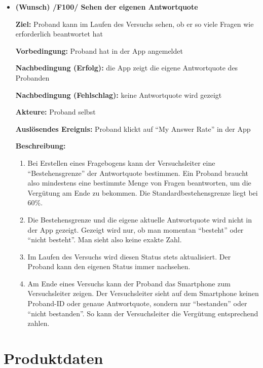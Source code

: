 \documentclass[a4paper]{scrreprt}
\begin{document}
\begin{itemize}
            \item \textbf{(Wunsch) /F100/ Sehen der eigenen \gls{Antwortquote}}

            \par \textbf{Ziel: }\gls{Proband} kann im Laufen des Versuchs sehen, ob er so viele Fragen wie erforderlich beantwortet hat
            \par \textbf{Vorbedingung: }\gls{Proband} hat in der App angemeldet
            \par \textbf{Nachbedingung (Erfolg): }die App zeigt die eigene \gls{Antwortquote} des \gls{Proband}en
            \par \textbf{Nachbedingung (Fehlschlag): }keine \gls{Antwortquote} wird gezeigt
            \par \textbf{Akteure: }\gls{Proband} selbst
            \par \textbf{Auslösendes Ereignis: }\gls{Proband} klickt auf “My Answer Rate” in der App
            \par \textbf{Beschreibung: }
                \begin{enumerate}
                    \item Bei Erstellen eines Fragebogens kann der \gls{Versuchsleiter} eine “Bestehensgrenze” der \gls{Antwortquote} bestimmen. Ein \gls{Proband} braucht also mindestens eine bestimmte Menge von Fragen beantworten, um die Vergütung am Ende zu bekommen. Die Standardbestehensgrenze liegt bei 60\%.
                    \item Die Bestehensgrenze und die eigene aktuelle \gls{Antwortquote} wird nicht in der App gezeigt. Gezeigt wird nur, ob man momentan “besteht” oder “nicht besteht”. Man sieht also keine exakte Zahl.
                    \item Im Laufen des Versuchs wird diesen Status stets aktualisiert. Der \gls{Proband} kann den eigenen Status immer nachsehen.
                    \item Am Ende eines Versuchs kann der \gls{Proband} das Smartphone zum \gls{Versuchsleiter} zeigen. Der \gls{Versuchsleiter} sieht auf dem Smartphone keinen \gls{Proband}-ID oder genaue \gls{Antwortquote}, sondern nur “bestanden” oder “nicht bestanden”. So kann der \gls{Versuchsleiter} die Vergütung entsprechend zahlen.
                \end{enumerate}

        \end{itemize}

    \chapter{Produktdaten}
\end{document}
